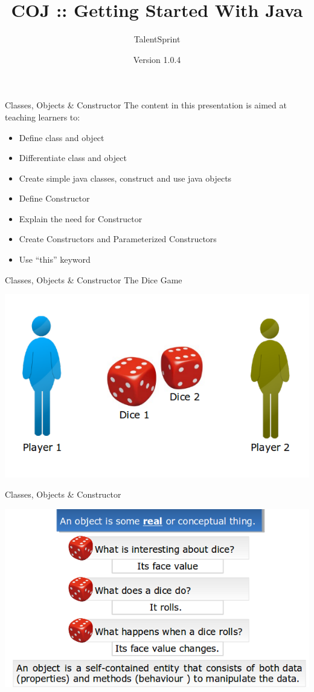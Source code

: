 \documentclass[14pt]{beamer}
\title[CP01.13 BC]{COJ :: Getting Started With Java}
\author[TS]{TalentSprint}
\institute[L\&D]{Licensed To Skill}
\date{Version 1.0.4}
\begin{document}
\begin{frame}
  \titlepage
\end{frame}
\begin{frame}{Classes, Objects \& Constructor}
The content in this presentation is aimed at teaching  learners to:
 \begin{itemize}
  \item Define class and object
  \item Differentiate class and object
  \item Create simple java classes, construct and use java objects
  \item Define Constructor
  \item Explain the need for Constructor 
  \item Create Constructors and Parameterized Constructors
  \item Use ``this'' keyword
 \end{itemize}
\end{frame}

\begin{frame}{Classes, Objects \& Constructor}
The Dice Game
\begin{center}
    \includegraphics[scale=0.4]{COJ-M01-S03-Image1.png}
  \end{center}
\end{frame}
\begin{frame}{Classes, Objects \& Constructor}
\begin{center}
        \includegraphics[scale=0.5]{COJ-M01-S03-Image2.png}
          \end{center}
      \end{frame}
\end{document}
